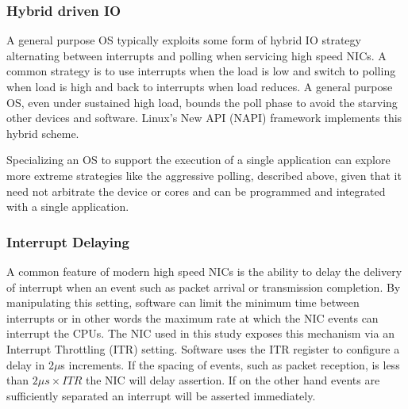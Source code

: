 \subsubsection{Hybrid driven IO}
\label{sec:workflow:hybridio}
A general purpose OS typically exploits some form of hybrid IO strategy alternating between interrupts and polling when servicing high speed NICs. A common strategy is to use interrupts when the load is low and switch to polling when load is high and back to interrupts when load reduces.  A general purpose OS, even under sustained high load, bounds the poll phase to avoid the starving other devices and software. Linux's New API (NAPI)\cite{NAPI} framework implements this hybrid scheme.


Specializing an OS to support the execution of a single application can explore more extreme strategies like the aggressive polling, described above, given that it need not arbitrate the device or cores and can be programmed and integrated with a single application.  

\subsubsection{Interrupt Delaying}
\label{sec:workflow:itrdelay}
%
A common feature of modern high speed NICs is the ability to delay the delivery of interrupt when an event such as packet arrival or transmission completion. By manipulating this setting, software can limit the minimum time between interrupts or in other words the maximum rate at which the NIC events can interrupt the CPUs. The NIC used in this study exposes this mechanism via an Interrupt Throttling (ITR) setting. Software uses the ITR register to configure a delay in 2$\mu$s increments.  If the spacing of events, such as packet reception, is less than  $2{\mu}s \times ITR$ the NIC will delay assertion.  If on the other hand events are sufficiently separated an interrupt will be asserted immediately.   

